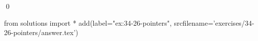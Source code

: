 
\begin{ex}
  \label{ex:34-26-pointers}
  
  \qed
\end{ex}
\begin{python0}
from solutions import *
add(label="ex:34-26-pointers",
    srcfilename='exercises/34-26-pointers/answer.tex')
\end{python0}
